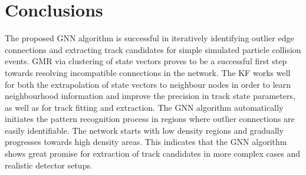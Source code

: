\section{Conclusions}

The proposed GNN algorithm is successful in iteratively identifying outlier edge connections and extracting track candidates for simple simulated particle collision events. GMR via clustering of state vectors proves to be a successful first step towards resolving incompatible connections in the network. The KF works well for both the extrapolation of state vectors to neighbour nodes in order to learn neighbourhood information and improve the precision in track state parameters, as well as for track fitting and extraction. The GNN algorithm automatically initiates the pattern recognition process in regions where outlier connections are easily identifiable. The network starts with low density regions and gradually progresses towards high density areas. This indicates that the GNN algorithm shows great promise for extraction of track candidates in more complex cases and realistic detector setups.